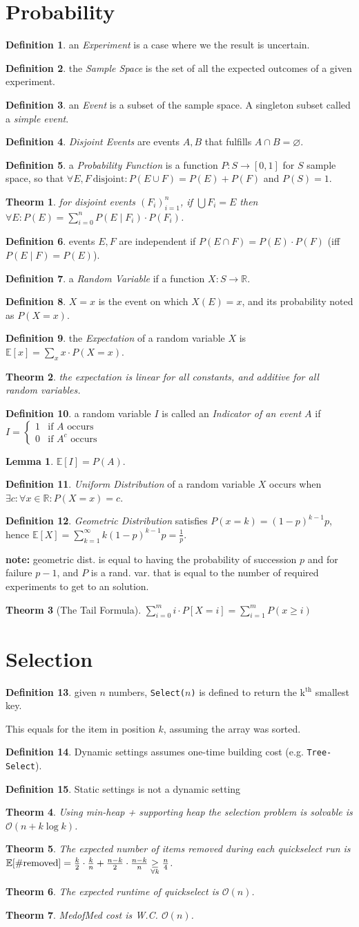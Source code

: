 \documentclass[]{article}
\newcommand\compactsection   [1]        {\vspace{-10pt}\section{#1}\vspace{-5pt}}
\newcommand\R     {\mathbb{R}}
\newcommand\E     {\mathbb{E}}
\newcommand\oc    {\mathcal{O}}
\renewcommand\inf {\infty}
\newcommand\sumni     {\sum_{i = 0}^{n}}
\newcommand\co        {\colon}
\newtheorem{Theorem}{Theorm}
\theoremstyle{definition}
\newtheorem{Definition}{Definition}
\newtheorem{Lemma}{Lemma}
\newcommand\theo  [1] {\begin{Theorem}#1\end{Theorem}}
\newcommand\defi  [1] {\begin{Definition}#1\end{Definition}}
\newcommand\lem   [1] {\begin{Lemma}#1\end{Lemma}}
\begin{document}
\begin{multicols}{4}
		\compactsection{Probability}
			\defi{an \textit{Experiment} is a case where we the result is uncertain. }
			\defi{the \textit{Sample Space} is the set of all the expected outcomes of a given experiment. }
			\defi{an \textit{Event} is a subset of the sample space. A singleton subset called a \textit{simple event}. }
			\defi{\textit{Disjoint Events} are events $A, B$ that fulfills $A \cap B = \varnothing$. }
			\defi{a \textit{Probability Function} is a function $P \co S \to [0, 1]$ for $S$ sample space, so that $\forall E, F \ \text{disjoint} \co P(E \cup F) = P(E) + P(F)$ and $P(S) = 1$. }
			\theo{for disjoint events $(F_i)_{i = 1}^{n}$, if $\bigcup F_i = E $ then $\forall E \co P(E) = \sumni P(E \mid F_i) \cdot P(F_i)$. }
			\defi{events $E, F$ are independent if $P(E \cap F) = P(E) \cdot P(F)$ (iff $P(E \mid F) = P(E)$). }
			\defi{a \textit{Random Variable} if a function $X \co S \to \R$. }
			\defi{$X = x$ is the event on which $X(E) = x$, and its probability noted as $P(X = x)$. }
			\defi{the \textit{Expectation} of a random variable $X$ is $\E[x] = \sum_{x} x \cdot P(X = x)$. }
			\theo{the expectation is linear for all constants, and additive for all random variables. }
			\defi{a random variable $I$ is called an \textit{Indicator of an event $A$} if $I = \begin{cases}
					1 & \text{if $A$ occurs} \\
					0 & \text{if $A^c$ occurs}
				\end{cases}$}
			\lem{$\E[I] = P(A)$. }
			\defi{\textit{Uniform Distribution} of a random variable $X$ occurs when $\exists c \co \forall x \in \R \co P(X = x) = c$. }
			\defi{\textit{Geometric Distribution} satisfies $P(x = k) = (1 - p)^{k - 1}p$, hence $\E[X] = \sum_{k = 1}^{\inf} k(1 - p)^{k - 1}p = \frac{1}{p}$. }
			\textbf{note: }geometric dist. is equal to having the probability of succession $p$ and for failure $p - 1$, and $P$ is a rand. var. that is equal to the number of required experiments to get to an solution. 
			\begin{Theorem}[The Tail Formula]
				\hfil $\sum_{i = 0}^{m}i \cdot P[X = i] = \sum_{i = 1}^{m} P(x \ge i)$
			\end{Theorem}
		
		\compactsection{Selection}
			\defi{given $n$ numbers, \texttt{Select($n$)} is defined to return the k$^{\text{th}}$ smallest key. }
			This equals for the item in position $k$, assuming the array was sorted. 
			\defi{Dynamic settings assumes one-time building cost (e.g. \texttt{Tree-Select}). }
			\defi{Static settings is not a dynamic setting} %
			\theo{Using min-heap + supporting heap the selection problem is solvable is $\oc(n + k \log k)$. }
			\theo{The expected number of items removed during each quickselect run is $\E[\#\text{\rm removed}] = \frac{k}{2}\cdot\frac{k}{n} + \frac{n - k}{2}\cdot\frac{n - k}{n} \underset{\forall k}{\ge} \frac{n}{4}$. }
			\theo{The expected runtime of quickselect is $\oc(n)$. }
			\theo{MedofMed cost is W.C. $\oc(n)$. }
		

\end{multicols}
\end{document}
